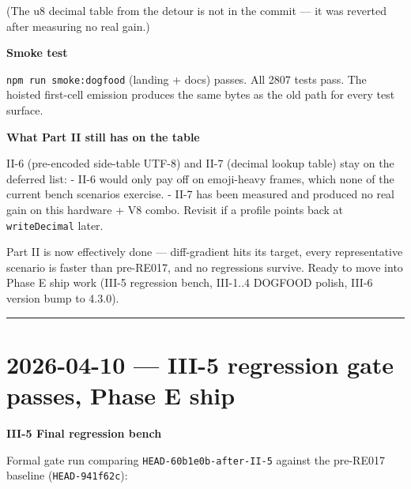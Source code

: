 (The u8 decimal table from the detour is not in the commit --- it was reverted after measuring no real gain.)

\textbf{Smoke test}

\texttt{n\allowbreak{}p\allowbreak{}m\allowbreak{} \allowbreak{}r\allowbreak{}u\allowbreak{}n\allowbreak{} \allowbreak{}s\allowbreak{}m\allowbreak{}o\allowbreak{}k\allowbreak{}e\allowbreak{}:\allowbreak{}d\allowbreak{}o\allowbreak{}g\allowbreak{}f\allowbreak{}o\allowbreak{}o\allowbreak{}d} (landing + docs) passes. All 2807 tests pass. The hoisted first-cell emission produces the same bytes as the old path for every test surface.

\textbf{What Part II still has on the table}

II-6 (pre-encoded side-table UTF-8) and II-7 (decimal lookup table) stay on the deferred list: - II-6 would only pay off on emoji-heavy frames, which none of the current bench scenarios exercise. - II-7 has been measured and produced no real gain on this hardware + V8 combo. Revisit if a profile points back at \texttt{w\allowbreak{}r\allowbreak{}i\allowbreak{}t\allowbreak{}e\allowbreak{}D\allowbreak{}e\allowbreak{}c\allowbreak{}i\allowbreak{}m\allowbreak{}a\allowbreak{}l} later.

Part II is now effectively done --- diff-gradient hits its target, every representative scenario is faster than pre-RE017, and no regressions survive. Ready to move into Phase E ship work (III-5 regression bench, III-1..4 DOGFOOD polish, III-6 version bump to 4.3.0).

\begin{center}\rule{0.5\linewidth}{0.5pt}\end{center}

\section{2026-04-10 --- III-5 regression gate passes, Phase E ship}\label{record-422-iii-5-regression-gate-passes-phase-e-ship}

\textbf{III-5 Final regression bench}

Formal gate run comparing \texttt{H\allowbreak{}E\allowbreak{}A\allowbreak{}D\allowbreak{}-\allowbreak{}6\allowbreak{}0\allowbreak{}b\allowbreak{}1\allowbreak{}e\allowbreak{}0\allowbreak{}b\allowbreak{}-\allowbreak{}a\allowbreak{}f\allowbreak{}t\allowbreak{}e\allowbreak{}r\allowbreak{}-\allowbreak{}I\allowbreak{}I\allowbreak{}-\allowbreak{}5} against the pre-RE017 baseline (\texttt{H\allowbreak{}E\allowbreak{}A\allowbreak{}D\allowbreak{}-\allowbreak{}9\allowbreak{}4\allowbreak{}1\allowbreak{}f\allowbreak{}6\allowbreak{}2\allowbreak{}c}):

